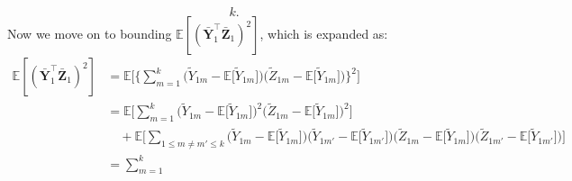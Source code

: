 \documentclass[twoside,11pt]{article}
\newcommand{\rvTwo}{Y}
\newcommand{\rvThree}{Z}
\newcommand{\vectorize}[1]{\mathbf{#1}}
\newcommand{\private}[1]{\tilde{#1}}
\newcommand{\mE}{\mathbb{E}} %
\newcommand{\alphabetSize}{k} %
\newcommand{\vectorIndex}{m}
\begin{document}
\begin{appendix}
\begin{itemize}
\begin{equation}
		\alphabetSize.	
	\end{equation}
	\noindent
	Now we move on to bounding $
	\mE[
	(
	\bar{\vectorize{\rvTwo}}_1^\top
	\bar{\vectorize{\rvThree}}_1)^2]
	$, which is expanded as:
	\begin{align*}
		\mE[
		(
		\bar{\vectorize{\rvTwo}}_1^\top 
		\bar{\vectorize{\rvThree}}_1
		)^2
		]
		&=
		\mE
		\biggl[ %
		\biggl\{%
		\sum_{\vectorIndex = 1}^\alphabetSize %
		\bigl( %
		\private{\rvTwo}_{1 \vectorIndex}
		- %
		\mE
		\bigl[
		\private{\rvTwo}_{1 \vectorIndex}
		\bigr]
		\bigr)%
		\bigl( %
		\private{\rvThree}_{1 \vectorIndex}
		-
		\mE
		\bigl[
		\private{\rvTwo}_{1 \vectorIndex}
		\bigr]
		\bigr)%
		\biggl\}^2 %
		\biggr]
		\\&=
		\mE
		\biggl[ %
		\sum_{\vectorIndex = 1}^\alphabetSize %
		\bigl( %
		\private{\rvTwo}_{1 \vectorIndex}
		- %
		\mE
		\bigl[
		\private{\rvTwo}_{1 \vectorIndex}
		\bigr]
		\bigr)^2%
		\bigl( %
		\private{\rvThree}_{1 \vectorIndex}
		-
		\mE
		\bigl[
		\private{\rvTwo}_{1 \vectorIndex}
		\bigr]
		\bigr)^2%
		\biggr]
		\\  & \quad+
		\mE
		\biggl[ %
		\sum_{1 \leq \vectorIndex \neq \vectorIndex' \leq \alphabetSize} %
		\bigl( %
		\private{\rvTwo}_{1 \vectorIndex}
		- %
		\mE
		\bigl[
		\private{\rvTwo}_{1 \vectorIndex}
		\bigr]
		\bigr)%
		\bigl( %
		\private{\rvTwo}_{1 \vectorIndex'}
		- %
		\mE
		\bigl[
		\private{\rvTwo}_{1 \vectorIndex'}
		\bigr]
		\bigr)%
		\bigl( %
		\private{\rvThree}_{1 \vectorIndex}
		-
		\mE
		\bigl[
		\private{\rvTwo}_{1 \vectorIndex}
		\bigr]
		\bigr)%
		\bigl( %
		\private{\rvThree}_{1 \vectorIndex'}
		-
		\mE
		\bigl[
		\private{\rvTwo}_{1 \vectorIndex'}
		\bigr]
		\bigr)%
		\biggr]
		\\&=
		\sum_{\vectorIndex = 1}^\alphabetSize

\end{align*}
\end{itemize}
\end{appendix}
\end{document}
